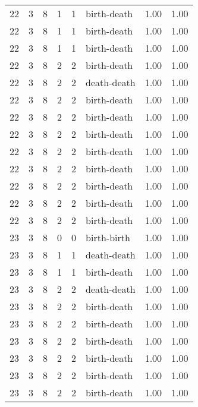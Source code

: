 \documentclass{article}
\begin{document}
\begin{center}
\begin{tabular}{rrrrrlrr}
22 & 3 & 8 & 1 & 1 & birth-death & 1.00 & 1.00 \\
22 & 3 & 8 & 1 & 1 & birth-death & 1.00 & 1.00 \\
22 & 3 & 8 & 1 & 1 & birth-death & 1.00 & 1.00 \\
22 & 3 & 8 & 2 & 2 & birth-death & 1.00 & 1.00 \\
22 & 3 & 8 & 2 & 2 & death-death & 1.00 & 1.00 \\
22 & 3 & 8 & 2 & 2 & birth-death & 1.00 & 1.00 \\
22 & 3 & 8 & 2 & 2 & birth-death & 1.00 & 1.00 \\
22 & 3 & 8 & 2 & 2 & birth-death & 1.00 & 1.00 \\
22 & 3 & 8 & 2 & 2 & birth-death & 1.00 & 1.00 \\
22 & 3 & 8 & 2 & 2 & birth-death & 1.00 & 1.00 \\
22 & 3 & 8 & 2 & 2 & birth-death & 1.00 & 1.00 \\
22 & 3 & 8 & 2 & 2 & birth-death & 1.00 & 1.00 \\
22 & 3 & 8 & 2 & 2 & birth-death & 1.00 & 1.00 \\
23 & 3 & 8 & 0 & 0 & birth-birth & 1.00 & 1.00 \\
23 & 3 & 8 & 1 & 1 & death-death & 1.00 & 1.00 \\
23 & 3 & 8 & 1 & 1 & birth-death & 1.00 & 1.00 \\
23 & 3 & 8 & 2 & 2 & death-death & 1.00 & 1.00 \\
23 & 3 & 8 & 2 & 2 & birth-death & 1.00 & 1.00 \\
23 & 3 & 8 & 2 & 2 & birth-death & 1.00 & 1.00 \\
23 & 3 & 8 & 2 & 2 & birth-death & 1.00 & 1.00 \\
23 & 3 & 8 & 2 & 2 & birth-death & 1.00 & 1.00 \\
23 & 3 & 8 & 2 & 2 & birth-death & 1.00 & 1.00 \\
23 & 3 & 8 & 2 & 2 & birth-death & 1.00 & 1.00 \\
\bottomrule
\end{tabular}


\end{center}
\end{document}
